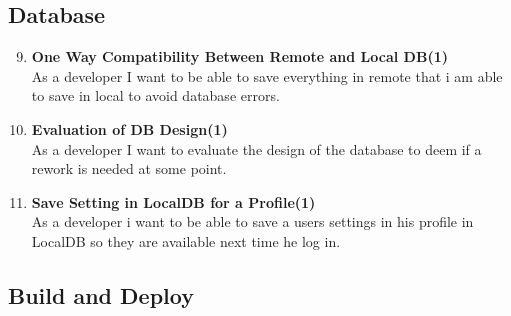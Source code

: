 \subsection{Database}

\begin{enumerate}
	\setcounter{enumi}{8} %
	\item \textbf{One Way Compatibility Between Remote and Local DB(1)}\\
	As a developer I want to be able to save everything in remote that i am able to save in local to avoid database errors.
	
	\item \textbf{Evaluation of DB Design(1)}\\
	As a developer I want to evaluate the design of the database to deem if a rework is needed at some point. 
	
	\item \textbf{Save Setting in LocalDB for a Profile(1)}\\
	As a developer i want to be able to save a users settings in his profile in LocalDB so they are available next time he log in.
\end{enumerate}

\subsection{Build and Deploy}

